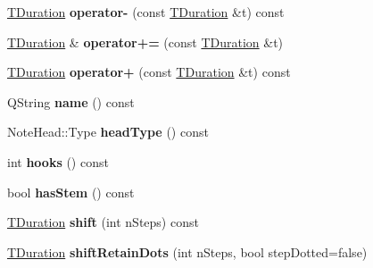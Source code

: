 \begin{DoxyCompactItemize}
\mbox{\label{class_ms_1_1_t_duration_a7d1a8c6e97ceeeb6b66e4939ed384337}} 
\hyperlink{class_ms_1_1_t_duration}{T\+Duration} {\bfseries operator-\/} (const \hyperlink{class_ms_1_1_t_duration}{T\+Duration} \&t) const
\item 
\mbox{\label{class_ms_1_1_t_duration_a638575f91ec15a1d0dd3ccb12b0be14f}} 
\hyperlink{class_ms_1_1_t_duration}{T\+Duration} \& {\bfseries operator+=} (const \hyperlink{class_ms_1_1_t_duration}{T\+Duration} \&t)
\item 
\mbox{\label{class_ms_1_1_t_duration_a1fd0a6a7768875f1010cb8556a0e3b07}} 
\hyperlink{class_ms_1_1_t_duration}{T\+Duration} {\bfseries operator+} (const \hyperlink{class_ms_1_1_t_duration}{T\+Duration} \&t) const
\item 
\mbox{\label{class_ms_1_1_t_duration_ac4999437d7d9f5ed8d2e5462d90832b2}} 
Q\+String {\bfseries name} () const
\item 
\mbox{\label{class_ms_1_1_t_duration_aab1a411cf428fcc4244950a88b03ab95}} 
Note\+Head\+::\+Type {\bfseries head\+Type} () const
\item 
\mbox{\label{class_ms_1_1_t_duration_a11652d3de9232ccf4fb664758fecfaf3}} 
int {\bfseries hooks} () const
\item 
\mbox{\label{class_ms_1_1_t_duration_ad21f0ae5b6c87ce1c3d4a5b9607222d2}} 
bool {\bfseries has\+Stem} () const
\item 
\mbox{\label{class_ms_1_1_t_duration_af3a0508526f75ba00001668f5be9c91a}} 
\hyperlink{class_ms_1_1_t_duration}{T\+Duration} {\bfseries shift} (int n\+Steps) const
\item 
\mbox{\label{class_ms_1_1_t_duration_a31e4de8148fea5214921f533b468eb88}} 
\hyperlink{class_ms_1_1_t_duration}{T\+Duration} {\bfseries shift\+Retain\+Dots} (int n\+Steps, bool step\+Dotted=false)
\item 
\mbox{\label{class_ms_1_1_t_duration_af124a72ad48a794523039afbcdd9e695}} 

\end{DoxyCompactItemize}
